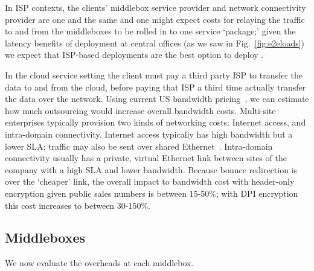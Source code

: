 In ISP contexts, the clients' middlebox service provider and network connectivity provider are one and the same and one might expect costs for relaying the traffic to and from the middleboxes to be rolled in to one service `package;' given the latency benefits of deployment at central offices (as we saw in Fig.~\ref{fig:e2eloads}) we expect that ISP-based deployments are the best option to deploy \sys.

In the cloud service setting the client must pay a third party ISP to transfer the data to and from the cloud, before paying that ISP a third time actually transfer the data over the network.
Using current US bandwidth pricing~\cite{comcast-costs, megapath-costs, verizon-costs}, we can estimate how much outsourcing would increase overall bandwidth costs.
Multi-site enterprises typically provision two kinds of networking costs: Internet access, and intra-domain connectivity. 
Internet access typically has high bandwidth but a lower SLA; traffic may also be sent over shared Ethernet~\cite{comcast-costs, verizon-costs}.
Intra-domain connectivity usually has a private, virtual Ethernet link between sites of the company with a high SLA and lower bandwidth.
Because bounce redirection is over the `cheaper' link, the overall impact to bandwidth cost with header-only encryption given public sales numbers is between 15-50\%; with DPI encryption this cost increases to between 30-150\%. 


\subsection{Middleboxes}
\label{sec:evalcloud}

We now evaluate the overheads at each middlebox. 

